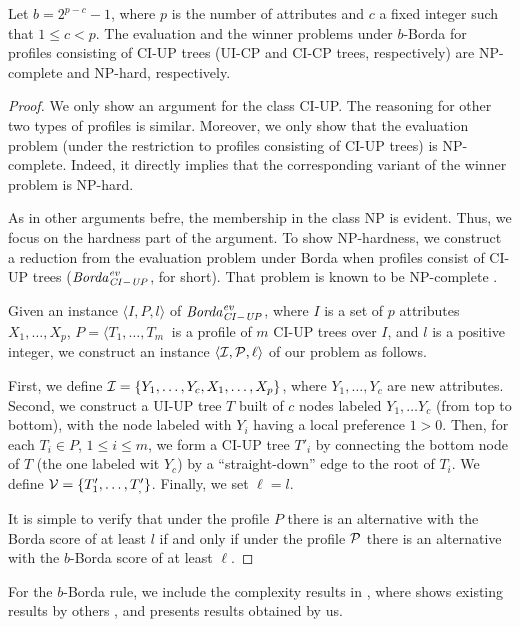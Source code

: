 \begin{thm}
\label{thm6}
Let $b=2^{p-c}-1$, where $p$ is the number of attributes and $c$ a fixed
integer such that $1\leq c <p$. The evaluation
and the winner problems under $b$-Borda for profiles consisting of
CI-UP trees (UI-CP and CI-CP trees, respectively) are NP-complete 
and NP-hard, respectively.
\end{thm}
\begin{proof}
We only show an argument for the class CI-UP. The reasoning for other 
two types of profiles is similar. Moreover, we only show that the evaluation
problem (under the restriction to profiles consisting of CI-UP trees) is
NP-complete. Indeed, it directly implies that the corresponding variant of
the winner problem is NP-hard.
 
As in other arguments befre, the membership in the class NP is evident.
Thus, we focus on the hardness part of the argument. To show NP-hardness,
we construct a reduction from the evaluation problem under Borda when
profiles consist of CI-UP trees ($\mathit{Borda}^{\mathit{ev}}_{\mathit{CI-UP}}$, for short). That problem is 
known to be NP-complete \cite{lang:aggLP}.

Given an instance $\langle I, P, l \rangle$ of $\mathit{Borda}^{\mathit{ev}}_{\mathit{CI-UP}}$, where $I$ is a set 
of $p$ attributes $X_1,\ldots, X_p$, $P=\langle T_1,\ldots, T_m\>$ is a profile
of $m$ CI-UP trees over $I$, and $l$ is a positive integer, we construct an 
instance $\langle \mathcal{I}, \mathcal{P},\ell\rangle$ of our problem as follows.

First, we define $\mathcal{I} = \{Y_1,\ldots, Y_c,X_1,\ldots,X_p \}$, where 
$Y_1, \ldots, Y_c$ are new attributes. Second, we construct a UI-UP tree $T$ 
built of $c$ nodes labeled $Y_1, \ldots Y_c$ (from top to bottom), with the 
node labeled with $Y_i$ having a local preference $1 > 0$. Then, for each  
$T_i \in P$, $1 \leq i \leq m$, we form a CI-UP tree $T'_i$ by connecting
the bottom node of $T$ (the one labeled wit $Y_c$) by a ``straight-down''
edge to the root of $T_i$. We define $\mathcal{V} = \{ T_1',\ldots,T_,' \}$. 
Finally, we set $\ell=l$.

It is simple to verify that under the profile $P$ there is an alternative 
with the Borda score of at least $l$ if and only if under the profile
$\mathcal{P}$ there is an alternative with the $b$-Borda score of at least $\ell$. 
\end{proof}

For the $b$-Borda rule, we include the complexity results in ,
where  shows existing results by others
\cite{lang:aggLP}, and  presents results obtained by us.

